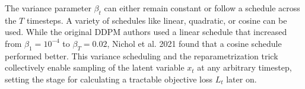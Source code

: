 The variance parameter \( \beta_t \) can either remain constant or follow a schedule across the \( T \) timesteps. A variety of schedules like linear, quadratic, or cosine can be used. While the original DDPM authors used a linear schedule that increased from \( \beta_1 = 10^{-4} \) to \( \beta_T = 0.02 \), Nichol et al. 2021 found that a cosine schedule performed better. This variance scheduling and the reparametrization trick collectively enable sampling of the latent variable \( x_t \) at any arbitrary timestep, setting the stage for calculating a tractable objective loss \( L_t \) later on.